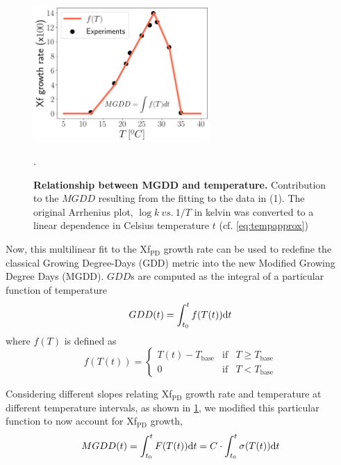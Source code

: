 \begin{figure}[H]
    \centering
    \includegraphics[width=0.6\textwidth]{Figures/Climatic_layer_1.png}
    \caption[Relationship between MGDD and temperature]{\textbf{Relationship
            between MGDD and temperature.}
        Contribution to the $MGDD$ resulting from the fitting to the data in
        (1). The
        original Arrhenius plot, $\log{k} \ vs. \ 1/T$ in kelvin was converted
        to
        a linear dependence in Celsius temperature $t$ (cf.
        \cref{eq:tempapprox})}.
    \label{figS2} %
\end{figure}

Now, this multilinear fit to the Xf$_{\textrm{PD}}$ growth rate can be
used to redefine the classical Growing Degree-Days (GDD) metric into the new
Modified Growing Degree Days (MGDD). $GDD$s are computed as the integral of a
particular function of temperature
\begin{equation}
    GDD(t)=\int_{t_0}^tf(T(t))\mathrm{d} t
\end{equation}
where $f(T)$ is defined as
\begin{equation}
    f(T(t))=\left\{\begin{array}{ccc}
        T(t) - T_{\textrm{base}} & \textrm{if} & T\geq T_{\textrm{base}} \\
        0                        & \textrm{if} & T < T_{\textrm{base}}
    \end{array} \right.
\end{equation}

Considering different slopes relating Xf$_{\textrm{PD}}$ growth rate and
temperature at different temperature intervals, as shown in \cref{figS2}, we
modified this particular function to now account for Xf$_{\textrm{PD}}$ growth,
\begin{equation}\label{eq:MGDD_t}
    MGDD(t)=\int_{t_0}^tF(T(t))\mathrm{d} t=C\cdot\int_{t_0}^t\sigma(T(t))\mathrm{d} t
\end{equation}

